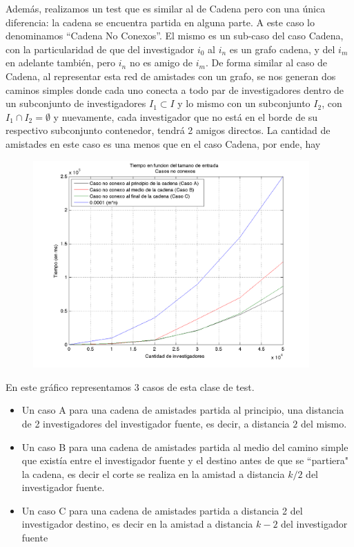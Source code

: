 Además, realizamos un test que es similar al de Cadena pero con una única diferencia: la cadena se encuentra partida en alguna parte. A este caso lo denominamos ``Cadena No Conexos''. El mismo es un sub-caso del caso Cadena, con la particularidad de que del investigador $i_0$ al $i_n$ es un grafo cadena, y del $i_m$ en adelante también, pero $i_n$ no es amigo de $i_m$.
De forma similar al caso de Cadena, al representar esta red de amistades con un grafo, se nos generan dos caminos simples donde cada uno conecta a todo par de investigadores dentro de un subconjunto de investigadores $I_1 \subset I $ y lo mismo con un subconjunto $I_2$, con $I_1 \cap I_2 = \emptyset $ y nuevamente, cada investigador que no está en el borde de su respectivo subconjunto contenedor, tendrá 2 amigos directos. La cantidad de amistades en este caso es una menos que en el caso Cadena, por ende, hay
\clearpage
\begin{figure}[h]
	\centering
	\includegraphics[width=400px]{./figs/noConexo.png}
\end{figure}

En este gráfico representamos 3 casos de esta clase de test. 
\begin{itemize}
	\item Un caso A para una cadena de amistades  partida al principio,  una distancia de 2 investigadores del investigador fuente, es decir, a distancia $2$ del mismo.
	\item Un caso B para una cadena de amistades partida al medio del camino simple que existía entre el investigador fuente y el destino antes de que se ``partiera" la cadena, es decir el corte se realiza en la amistad a distancia $k/2$ del investigador fuente.
	\item Un caso C para una cadena de amistades partida a distancia 2 del investigador destino, es decir en la amistad a distancia $k-2$ del investigador fuente
\end{itemize}

